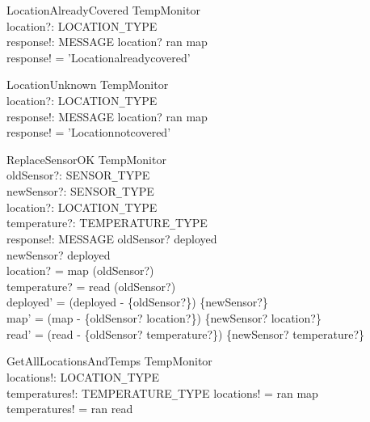 \documentclass[12pt]{article}
\begin{document}
\begin{schema}{LocationAlreadyCovered}
\Xi TempMonitor \\
location?: LOCATION\verb|_|TYPE \\
response!: MESSAGE
\where
location? \in ran \hspace{0.15cm} map \\
response! = 'Location\hspace{0.15cm}already\hspace{0.15cm}covered'
\end{schema}

\begin{schema}{LocationUnknown}
\Xi TempMonitor \\
location?: LOCATION\verb|_|TYPE \\
response!: MESSAGE
\where
location? \notin ran \hspace{0.15cm} map \\
response! = 'Location\hspace{0.15cm}not\hspace{0.15cm}covered'
\end{schema}

\begin{schema}{ReplaceSensorOK}
\Delta TempMonitor \\
oldSensor?: SENSOR\verb|_|TYPE \\
newSensor?: SENSOR\verb|_|TYPE \\
location?: LOCATION\verb|_|TYPE \\
temperature?: TEMPERATURE\verb|_|TYPE \\
response!: MESSAGE
\where
oldSensor? \in deployed \\
newSensor? \notin deployed \\
location? = map (oldSensor?) \\
temperature? = read (oldSensor?) \\
deployed' = (deployed - \{oldSensor?\}) \cup \{newSensor?\} \\
map' = (map - \{oldSensor? \rightarrow location?\}) \cup \{newSensor? \rightarrow location?\} \\
read' = (read - \{oldSensor? \rightarrow temperature?\}) \cup \{newSensor? \rightarrow temperature?\}
\end{schema}

\begin{schema}{GetAllLocationsAndTemps}
\Xi TempMonitor \\
locations!: \power LOCATION\verb|_|TYPE \\
temperatures!: \power TEMPERATURE\verb|_|TYPE
\where
locations! = ran \hspace{0.15cm} map \\
temperatures! = ran \hspace{0.15cm} read
\end{schema}
\end{document}
